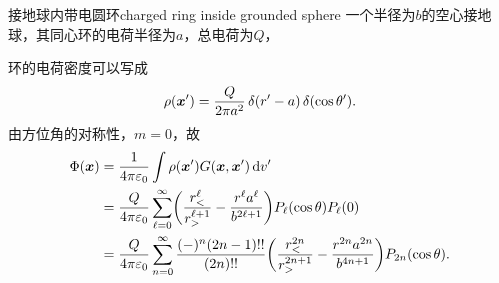 \begin{example}{接地球内带电圆环}{charged ring inside grounded sphere}
    一个半径为$b$的空心接地球，其同心环的电荷半径为$a$，总电荷为$Q$，

    环的电荷密度可以写成
    \[
        \rho(\bm x')=\frac Q{2\pi a^2}\mathop{}\!\delta(r'-a)\mathop{}\!\delta(\cos\theta').
    \]
    由方位角的对称性，$m=0$，故
    \begin{align*}
        \Phi(\bm x)&=\frac1{4\pi\varepsilon_0}\int\rho(\bm x')G(\bm x,\bm x')\mathop{}\!\mathrm{d} v'\\
        &=\frac Q{4\pi\varepsilon_0}\sum_{\ell=0}^{\infty}\biggl(\frac{r_<^\ell}{r_>^{\ell+1}}-\frac{r^\ell a^\ell}{b^{2\ell+1}}\biggr)P_\ell(\cos\theta)P_\ell(0)\\
        &=\frac Q{4\pi\varepsilon_0}\sum_{n=0}^\infty\frac{(-)^n(2n-1)!!}{(2n)!!}\biggl(\frac{r_<^{2n}}{r_>^{2n+1}}-\frac{r^{2n}a^{2n}}{b^{4n+1}}\biggr)P_{2n}(\cos\theta).
    \end{align*}
\end{example}
